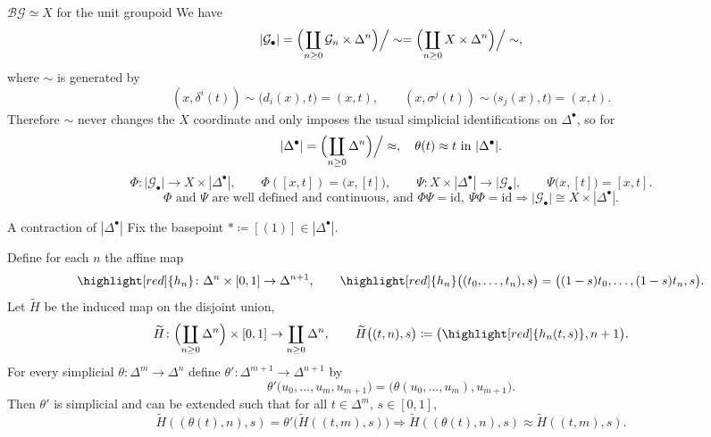 \documentclass[aspectratio=169]{beamer}
\newcommand{\G}{\mathcal{G}}
\begin{document}
\begin{frame}{$\mathcal B{\G}\simeq X$ for the unit groupoid}
We have
\[
|{\G}_\bullet|
=
\Bigl(\coprod_{n\ge 0} {\G}_n\times \Delta^n\Bigr)\Big/\sim
=
\Bigl(\coprod_{n\ge 0} X\times \Delta^n\Bigr)\Big/\sim,
\]
where $\sim$ is generated by
\[
(x,\delta^i(t))\sim \bigl(d_i(x),t\bigr)=(x,t),
\qquad
(x,\sigma^j(t))\sim \bigl(s_j(x),t\bigr)=(x,t).
\]\pause
Therefore $\sim$ never changes the $X$ coordinate and only imposes the usual simplicial identifications on $\Delta^\bullet$, so for
\[
|{\Delta}^\bullet|
=
\Bigl(\coprod_{n\ge 0} \Delta^n\Bigr)\Big/\approx, \quad \theta(t)\approx t
\ \text{in }|{\Delta}^\bullet|.
\]\pause
\[
\Phi\colon |{\G}_\bullet|\to X\times|{\Delta}^\bullet|,
\qquad
\Phi([x,t])=\bigl(x,[t]\bigr),
\qquad
\Psi\colon X\times|{\Delta}^\bullet|\to |{\G}_\bullet|,
\qquad
\Psi\bigl(x,[t]\bigr)=[x,t].
\]
\[
\Phi \text{ and }\Psi \text{ are well defined and continuous, and } \Phi\Psi=\mathrm{id},\ \Psi\Phi=\mathrm{id}
\Rightarrow
|{\G}_\bullet|\cong X\times |{\Delta}^\bullet|.
\]
\end{frame}

\begin{frame}{A contraction of $|\Delta^\bullet|$}
Fix the basepoint $\ast\coloneqq[(1)]\in|\Delta^\bullet|$.
\pause

Define for each $n$ the affine map
\[
\highlight[red]{h_n}\colon \Delta^n\times[0,1]\to \Delta^{n+1},
\qquad
\highlight[red]{h_n}\bigl((t_0,\dots,t_n),s\bigr)=\bigl((1-s)t_0,\dots,(1-s)t_n,s\bigr).
\]
Let $\widetilde H$ be the induced map on the disjoint union,
\[
\widetilde H\colon \Bigl(\coprod_{n\ge 0}\Delta^n\Bigr)\times[0,1]\rightarrow \coprod_{n\ge 0}\Delta^n,
\qquad \widetilde H\bigl((t,n),s\bigr)\coloneqq \bigl(\highlight[red]{h_n(t,s)},n+1\bigr).
\]
\pause
For every simplicial $\theta:\Delta^m\to\Delta^n$ define $\theta':\Delta^{m+1}\to\Delta^{n+1}$ by
\[
\theta'\bigl(u_0,\dots,u_m,u_{m+1}\bigr)=\bigl(\theta(u_0,\dots,u_m),u_{m+1}\bigr).
\]
Then $\theta'$ is simplicial and can be extended such that for all $t\in\Delta^m$, $s\in[0,1]$,
\[
\widetilde H((\theta(t),n),s)=\theta'\bigl(\widetilde H((t,m),s)\bigr)
\Rightarrow
\widetilde H((\theta(t),n),s)\approx \widetilde H((t,m),s).
\]
\end{frame}
\end{document}
